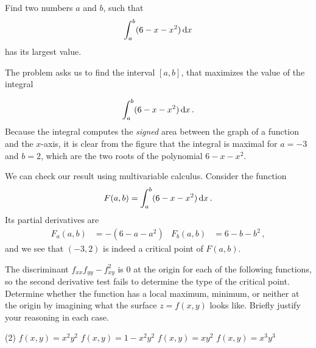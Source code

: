 \begin{question}
Find two numbers $a$ and $b$, such that
\[
\int_a^b (6-x-x^2) \,\mathrm{d} x
\]
has its largest value.
\end{question}

\begin{solution}
The problem asks us to find the interval $[a,b]$, that maximizes the value of the integral
\begin{wrapfigure}{r}{0.35\textwidth}
    \centering
{}
\end{wrapfigure}
\[
\int_a^b (6-x-x^2) \,\mathrm{d} x\,.
\]
Because the integral computes the \emph{signed} area between the graph of a function and the $x$-axis, it is clear from the figure that the integral is maximal for $a=-3$ and $b=2$, which are the two roots of the polynomial $6-x-x^2$.

We can check our result using multivariable calculus. Consider the function
\[
F(a,b) = \int_a^b (6-x-x^2) \,\mathrm{d} x\,.
\]
Its partial derivatives are
\begin{align*}
F_a(a,b) &= -(6-a-a^2) &
F_b(a,b) &= 6-b-b^2\,,
\end{align*}
and we see that $(-3,2)$ is indeed a critical point of $F(a,b)$.
\end{solution}

\begin{question}
The discriminant $f_{xx}f_{yy} - f_{xy}^2$ is $0$ at the origin for each of the following functions, so the second derivative test fails to determine the type of the critical point. Determine whether the function has a local maximum, minimum, or neither at the origin by imagining what the surface $z=f(x,y)$ looks like. Briefly justify your reasoning in each case.
\begin{tasks}(2)
\task
$f(x,y) = x^2y^2$
\task
$f(x,y) = 1 - x^2y^2$
\task
$f(x,y) = xy^2$
\task
$f(x,y) = x^3y^3$
\end{tasks}
\end{question}

